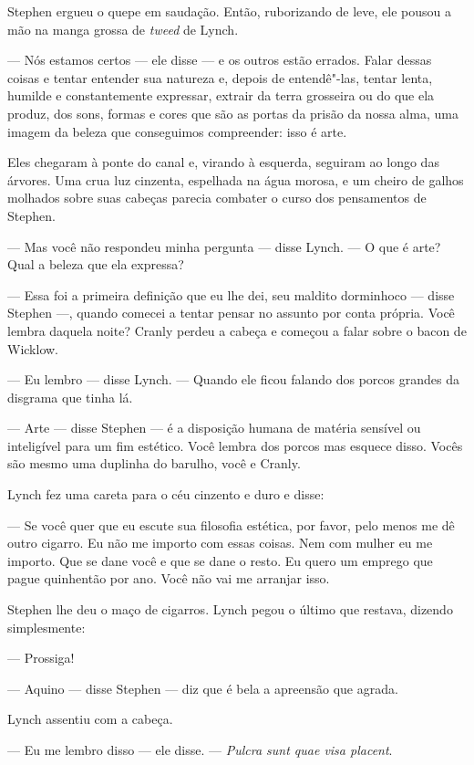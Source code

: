 Stephen ergueu o quepe em saudação. Então, ruborizando de leve, ele
pousou a mão na manga grossa de \textit{tweed} de Lynch.

 --- Nós estamos certos --- ele disse --- e os outros estão errados. Falar dessas
coisas e tentar entender sua natureza e, depois de entendê"-las, tentar
lenta, humilde e constantemente expressar, extrair da terra grosseira
ou do que ela produz, dos sons, formas e cores que são as portas da
prisão da nossa alma, uma imagem da beleza que conseguimos compreender:
isso é arte.

Eles chegaram à ponte do canal e, virando à esquerda, seguiram ao longo
das árvores. Uma crua luz cinzenta, espelhada na água morosa, e um
cheiro de galhos molhados sobre suas cabeças parecia combater o curso
dos pensamentos de Stephen.

 --- Mas você não respondeu minha pergunta --- disse Lynch. --- O que é arte? Qual
a beleza que ela expressa?

 --- Essa foi a primeira definição que eu lhe dei, seu maldito dorminhoco --- 
disse Stephen ---, quando comecei a tentar pensar no assunto por conta
própria. Você lembra daquela noite? Cranly perdeu a cabeça e começou a
falar sobre o bacon de Wicklow.

 --- Eu lembro --- disse Lynch. --- Quando ele ficou falando dos porcos grandes da
disgrama que tinha lá.

 --- Arte --- disse Stephen --- é a disposição humana de matéria sensível ou
inteligível para um fim estético. Você lembra dos porcos mas esquece
disso. Vocês são mesmo uma duplinha do barulho, você e Cranly.

Lynch fez uma careta para o céu cinzento e duro e disse:

 --- Se você quer que eu escute sua filosofia estética, por favor, pelo
menos me dê outro cigarro. Eu não me importo com essas coisas. Nem com
mulher eu me importo. Que se dane você e que se dane o resto. Eu
quero um emprego que pague quinhentão por ano. Você não vai me arranjar
isso.

Stephen lhe deu o maço de cigarros. Lynch pegou o último que restava,
dizendo simplesmente:

 --- Prossiga!

 --- Aquino --- disse Stephen --- diz que é bela a apreensão que agrada.

Lynch assentiu com a cabeça.

 --- Eu me lembro disso --- ele disse. --- \textit{Pulcra sunt quae visa placent}.

